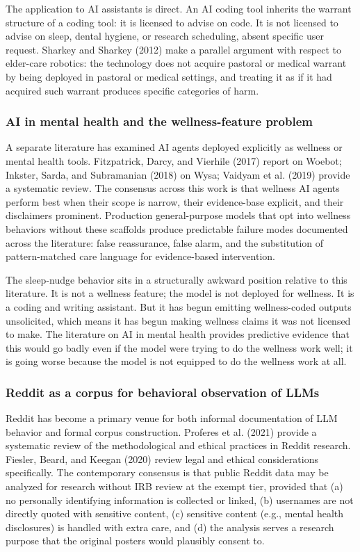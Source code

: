 \documentclass[11pt]{article}
\begin{document}
The application to AI assistants is direct. An AI coding tool inherits the warrant structure of a coding tool: it is licensed to advise on code. It is not licensed to advise on sleep, dental hygiene, or research scheduling, absent specific user request. Sharkey and Sharkey (2012) make a parallel argument with respect to elder-care robotics: the technology does not acquire pastoral or medical warrant by being deployed in pastoral or medical settings, and treating it as if it had acquired such warrant produces specific categories of harm.

\subsubsection{AI in mental health and the wellness-feature problem}

A separate literature has examined AI agents deployed explicitly as wellness or mental health tools. Fitzpatrick, Darcy, and Vierhile (2017) report on Woebot; Inkster, Sarda, and Subramanian (2018) on Wysa; Vaidyam et al. (2019) provide a systematic review. The consensus across this work is that wellness AI agents perform best when their scope is narrow, their evidence-base explicit, and their disclaimers prominent. Production general-purpose models that opt into wellness behaviors without these scaffolds produce predictable failure modes documented across the literature: false reassurance, false alarm, and the substitution of pattern-matched care language for evidence-based intervention.

The sleep-nudge behavior sits in a structurally awkward position relative to this literature. It is not a wellness feature; the model is not deployed for wellness. It is a coding and writing assistant. But it has begun emitting wellness-coded outputs unsolicited, which means it has begun making wellness claims it was not licensed to make. The literature on AI in mental health provides predictive evidence that this would go badly even if the model were trying to do the wellness work well; it is going worse because the model is not equipped to do the wellness work at all.

\subsubsection{Reddit as a corpus for behavioral observation of LLMs}

Reddit has become a primary venue for both informal documentation of LLM behavior and formal corpus construction. Proferes et al. (2021) provide a systematic review of the methodological and ethical practices in Reddit research. Fiesler, Beard, and Keegan (2020) review legal and ethical considerations specifically. The contemporary consensus is that public Reddit data may be analyzed for research without IRB review at the exempt tier, provided that (a) no personally identifying information is collected or linked, (b) usernames are not directly quoted with sensitive content, (c) sensitive content (e.g., mental health disclosures) is handled with extra care, and (d) the analysis serves a research purpose that the original posters would plausibly consent to.
\end{document}
